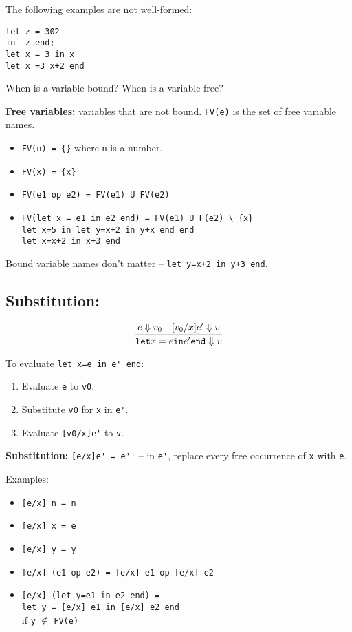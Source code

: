 \documentclass[11pt]{article}
\begin{document}
The following examples are not well-formed:
\begin{verbatim}
let z = 302
in -z end;
let x = 3 in x
let x =3 x+2 end
\end{verbatim}

When is a variable bound? When is a variable free?

\textbf{Free variables:} variables that are not bound. \verb~FV(e)~ is the set of free variable names. 
\begin{itemize}
    \item \verb~FV(n) = {}~ where \verb~n~ is a number.
    \item \verb~FV(x) = {x}~
    \item \verb~FV(e1 op e2) = FV(e1) U FV(e2)~
    \item \verb~FV(let x = e1 in e2 end) = FV(e1) U F(e2) \ {x}~ \\
        \verb~let x=5 in let y=x+2 in y+x end end~ \\
        \verb~let x=x+2 in x+3 end~
\end{itemize}

Bound variable names don't matter -- \verb~let y=x+2 in y+3 end~.

\subsection{Substitution:} 

\[
    \infer{\verb~let~ x = e \verb~in~ e^{\prime} \verb~end~ \Downarrow v}{
        e \Downarrow v_0
        &
        [v_0/x] e^{\prime} \Downarrow v
    }
\]

To evaluate \verb~let x=e in e' end~:
\begin{enumerate}
    \item Evaluate \verb~e~ to \verb~v0~.
    \item Substitute \verb~v0~ for \verb~x~ in \verb~e'~.
    \item Evaluate \verb~[v0/x]e'~ to \verb~v~.
\end{enumerate}

\textbf{Substitution:} \verb~[e/x]e' = e''~ -- in \verb~e'~, replace every free occurrence of \verb~x~ with \verb~e~.

Examples:
\begin{itemize}
    \item \verb~[e/x] n = n~
    \item \verb~[e/x] x = e~
    \item \verb~[e/x] y = y~
    \item \verb~[e/x] (e1 op e2) = [e/x] e1 op [e/x] e2~
    \item \verb~[e/x] (let y=e1 in e2 end) =~ \\
        \verb~let y = [e/x] e1 in [e/x] e2 end~ \\
        if \verb~y~ $\notin$ \verb~FV(e)~
\end{itemize}
\end{document}
